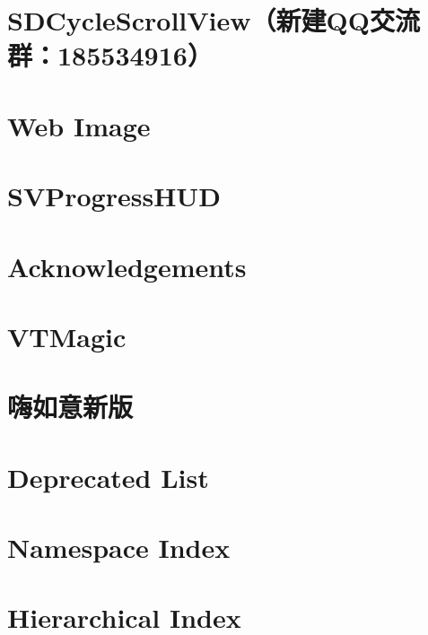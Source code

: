 \documentclass[twoside]{book}
\newcommand{\+}{\discretionary{\mbox{\scriptsize$\hookleftarrow$}}{}{}}
\begin{document}
\chapter{S\+D\+Cycle\+Scroll\+View（新建\+Q\+Q交流群：185534916）}
\label{md__pods__s_d_cycle_scroll_view__r_e_a_d_m_e}

\chapter{Web Image}
\label{md__pods__s_d_web_image__r_e_a_d_m_e}

\chapter{S\+V\+Progress\+H\+UD}
\label{md__pods__s_v_progress_h_u_d__r_e_a_d_m_e}

\chapter{Acknowledgements}
\label{md__pods__target__support__files__pods-_t_h_b__pods-_t_h_b-acknowledgements}

\chapter{V\+T\+Magic}
\label{md__pods__v_t_magic__r_e_a_d_m_e}

\chapter{嗨如意新版}
\label{md__r_e_a_d_m_e}

\chapter{Deprecated List}
\label{deprecated}

\chapter{Namespace Index}

\chapter{Hierarchical Index}

\end{document}
